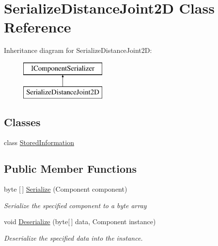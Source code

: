 \hypertarget{class_serialize_distance_joint2_d}{}\section{Serialize\+Distance\+Joint2D Class Reference}
\label{class_serialize_distance_joint2_d}
Inheritance diagram for Serialize\+Distance\+Joint2D\+:\begin{figure}[H]
\begin{center}
\leavevmode
\includegraphics[height=2.000000cm]{class_serialize_distance_joint2_d}
\end{center}
\end{figure}
\subsection*{Classes}
\begin{DoxyCompactItemize}
\item 
class \hyperlink{class_serialize_distance_joint2_d_1_1_stored_information}{Stored\+Information}
\end{DoxyCompactItemize}
\subsection*{Public Member Functions}
\begin{DoxyCompactItemize}
\item 
byte \mbox{[}$\,$\mbox{]} \hyperlink{class_serialize_distance_joint2_d_a5eecfd9c48d46eb25958ffb301924b3b}{Serialize} (Component component)
\begin{DoxyCompactList}\small\item\em Serialize the specified component to a byte array \end{DoxyCompactList}\item 
void \hyperlink{class_serialize_distance_joint2_d_a0b7341e25aba6354afa746c912bb20f5}{Deserialize} (byte\mbox{[}$\,$\mbox{]} data, Component instance)
\begin{DoxyCompactList}\small\item\em Deserialize the specified data into the instance. \end{DoxyCompactList}\end{DoxyCompactItemize}


